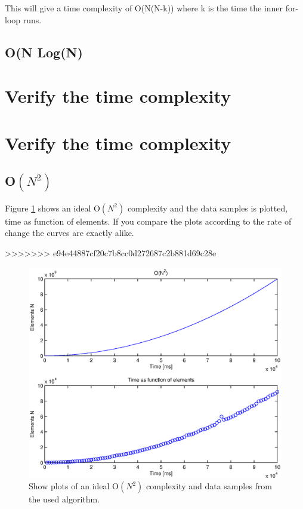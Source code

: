 This will give a time complexity of O(N(N-k)) where k is the time the inner for-loop runs.
\subsection{O(N Log(N)}

\section{Verify the time complexity}

\newpage
\section{Verify the time complexity}

\subsection{O\(\left( { N }^{ 2 } \right)\)}
Figure \ref{fig:test1} shows an ideal O\(\left( { N }^{ 2 } \right)\) complexity and the data samples is plotted, time as function of elements. If you compare the plots according to the rate of change the curves are exactly alike. 


>>>>>>> e94e44887cf20c7b8cc0d272687c2b881d69c28e
\begin{figure}[th!]
\centering
\includegraphics[width=1\textwidth]{./graphics/test1.eps}
\caption{Show plots of an ideal O\(\left( { N }^{ 2 } \right)\) complexity and data samples from the used algorithm.}

\label{fig:test1}
\end{figure}


